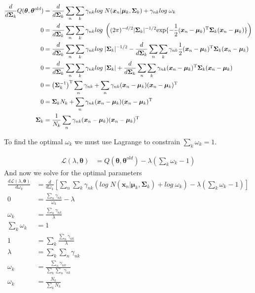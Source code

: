 \documentclass[11pt]{article}
\newcommand{\vct}[1]{\boldsymbol{#1}} %
\newcommand{\mat}[1]{\boldsymbol{#1}} %
\newcommand{\T}{^{\textrm T}} %
\begin{document}
\begin{align*}
\frac{d}{d\mat{\Sigma}_k}Q(\mat{\theta},\mat{\theta}^{old}) &= \frac{d}{d\mat{\Sigma}_k}\sum_n \sum_k \gamma_{nk}log \; N(\vct{x}_n | \vct{\mu}_k, \mat{\Sigma}_k) + \gamma_{nk} log \;  \omega_k\\
0 &=\frac{d}{d\mat{\Sigma}_k} \sum_n \sum_k \gamma_{nk}log \; \left((2 \pi)^{-d/2} |\mat{\Sigma}_k|^{-1/2} \text{exp}\{-\frac{1}{2}(\vct{x}_n - \vct{\mu}_k)\T \mat{\Sigma}_k (\vct{x}_n - \vct{\mu}_k)\}\right)\\
0 &=\frac{d}{d\mat{\Sigma}_k} \sum_n \sum_k \gamma_{nk}log \; |\mat{\Sigma}_k|^{-1/2}  - \frac{d}{d\mat{\Sigma}_k} \sum_n \sum_k \gamma_{nk} \frac{1}{2}(\vct{x}_n - \vct{\mu}_k)\T \mat{\Sigma}_k (\vct{x}_n - \vct{\mu}_k)\\
0 &=\frac{d}{d\mat{\Sigma}_k} \sum_n \sum_k \gamma_{nk}log \; |\mat{\Sigma}_k|  + \frac{d}{d\mat{\Sigma}_k} \sum_n \sum_k \gamma_{nk} (\vct{x}_n - \vct{\mu}_k)\T \mat{\Sigma}_k (\vct{x}_n - \vct{\mu}_k)\\
0 &= \left(\mat{\Sigma}_k^{-1}\right)\T \sum_n \gamma_{nk} + \sum_n \gamma_{nk} (\vct{x}_n - \vct{\mu}_k) (\vct{x}_n - \vct{\mu}_k)\T \\
0 &= \mat{\Sigma}_k N_k + \sum_n \gamma_{nk} (\vct{x}_n - \vct{\mu}_k) (\vct{x}_n - \vct{\mu}_k)\T \\
\mat{\Sigma}_k  &= \frac{1}{N_k} \sum_n \gamma_{nk} (\vct{x}_n - \vct{\mu}_k) (\vct{x}_n - \vct{\mu}_k)\T \\
\end{align*}

To find the optimal $\omega_k$ we must use Lagrange to constrain  $\sum_{k} \omega_k = 1$.

\begin{align*}
\mathcal{L}(\lambda,\mat{\theta})  &= Q(\mat{\theta},\mat{\theta}^{old}) - \lambda\left( \sum_{k} \omega_k - 1\right)
\end{align*}
And now we solve for the optimal parameters
\begin{align*}
\frac{d\mathcal{L}(\lambda,\mat{\theta}) }{d\omega_k} &= \frac{d}{d\omega_k}\left[\sum_n \sum_k \gamma_{nk}\left(log \; N(\vct{x}_n | \vct{\mu}_k, \mat{\Sigma}_k) + log \;  \omega_k\right)  - \lambda\left( \sum_{k} \omega_k - 1\right)\right]\\
0 &=  \frac{\sum_n \gamma_{nk}}{\omega_k} - \lambda\\
\omega_k &=  \frac{\sum_n \gamma_{nk}}{\lambda}\\
\sum_k \omega_k &=  1\\
1 &= \sum_k \frac{\sum_n \gamma_{nk}}{\lambda}\\
\lambda &= \sum_k \sum_n \gamma_{nk}\\
\omega_k &=  \frac{\sum_n \gamma_{nk}}{\sum_k \sum_n \gamma_{nk}}\\
\omega_k &=  \frac{N_k}{\sum_k N_k}\\
\end{align*} 
\end{document}
